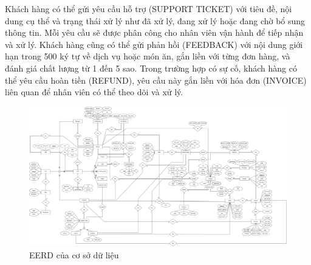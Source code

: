Khách hàng có thể gửi yêu cầu hỗ trợ (SUPPORT TICKET) với tiêu đề, nội dung cụ thể và trạng thái xử lý như đã xử lý, đang xử lý hoặc đang chờ bổ sung thông tin. Mỗi yêu cầu sẽ được phân công cho nhân viên vận hành để tiếp nhận và xử lý. Khách hàng cũng có thể gửi phản hồi (FEEDBACK) với nội dung giới hạn trong 500 ký tự về dịch vụ hoặc món ăn, gắn liền với từng đơn hàng, và đánh giá chất lượng từ 1 đến 5 sao. Trong trường hợp có sự cố, khách hàng có thể yêu cầu hoàn tiền (REFUND), yêu cầu này gắn liền với hóa đơn (INVOICE) liên quan để nhân viên có thể theo dõi và xử lý.

\begin{landscape}
\begin{figure}[H]
    \centering
    \includegraphics[height=0.85\textheight]{Images/db.png}
    \vspace{0.5cm}
    \caption{EERD của cơ sở dữ liệu}
    \label{fig:my_label}
\end{figure}
\end{landscape}



